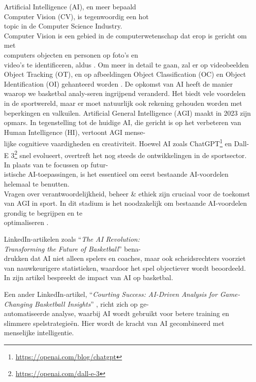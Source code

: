 Artificial Intelligence (AI), en meer bepaald \\Computer Vision (CV), is tegenwoordig een hot \\topic in de Computer Science Industry. 
\\Computer Vision is een gebied in de computerwetenschap dat erop is gericht om met \\computers objecten en personen op foto's en \\video's te identificeren, aldus \textcite{R5}. Om meer in detail te gaan, zal er op videobeelden Object Tracking (OT), en op afbeeldingen Object Classification (OC) en Object Identification (OI) gehanteerd worden \autocite{R8}.
De opkomst van AI heeft de manier waarop we basketbal analy-seren ingrijpend veranderd. Het biedt vele voordelen in de sportwereld, maar er moet natuurlijk ook rekening gehouden worden met beperkingen en valkuilen. 
Artificial General Intelligence (AGI) maakt in 2023 zijn opmars. In tegenstelling tot de huidige AI, die gericht is op het verbeteren van Human Intelligence (HI), vertoont AGI mense-\\lijke cognitieve vaardigheden en creativiteit. Hoewel AI zoals ChatGPT\footnote{\url{https://openai.com/blog/chatgpt}} en Dall-E 3\footnote{\url{https://openai.com/dall-e-3}} snel evolueert, overtreft het nog steeds de ontwikkelingen in de sportsector. In plaats van te focussen op futur-\\istische AI-toepassingen, is het essentieel om eerst bestaande AI-voordelen helemaal te benutten. \\Vragen over verantwoordelijkheid, beheer \& ethiek zijn cruciaal voor de toekomst van AGI in sport. In dit stadium is het noodzakelijk om bestaande AI-voordelen grondig te begrijpen en te \\optimaliseren \autocite{R6}.


LinkedIn-artikelen zoals ``\emph{The AI Revolution: \\Transforming the Future of Basketball}'' bena-\\drukken dat AI niet alleen spelers en coaches, maar ook scheidsrechters voorziet van nauwkeurigere statistieken, waardoor het spel objectiever wordt beoordeeld.
In zijn artikel bespreekt \textcite{R2} de impact van AI op basketbal.

Een ander LinkedIn-artikel, ``\emph{Courting Success: AI-Driven Analysis for Game-Changing Basketball Insights}'' \autocite{R3}, richt zich op ge-\\automatiseerde analyse, waarbij AI wordt gebruikt voor betere training en slimmere spelstrategieën. Hier wordt de kracht van AI gecombineerd met menselijke intelligentie.

